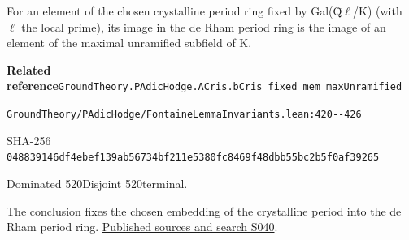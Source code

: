 
\begin{formalstatement}[D230]\label{decomp:D230}
For an element of the chosen crystalline period ring fixed by Gal(Q̄\ensuremath{\ell}/K) (with \ensuremath{\ell} the local prime), its image in the de Rham period ring is the image of an element of the maximal unramified subfield of K.
\end{formalstatement}
{\small\raggedright\noindent\textsf{\bfseries Related reference}\quad \nolinkurl{GroundTheory.PAdicHodge.ACris.bCris_fixed_mem_maxUnramified}\par\noindent \nolinkurl{GroundTheory/PAdicHodge/FontaineLemmaInvariants.lean:420--426}\par\noindent SHA-256 \nolinkurl{048839146df4ebef139ab56734bf211e5380fc8469f48dbb55bc2b5f0af39265}\par\noindent Dominated 520\quad Disjoint 520\quad terminal.\par}
The conclusion fixes the chosen embedding of the crystalline period into the de Rham period ring.
\hyperref[lit:S040]{Published sources and search S040}.
